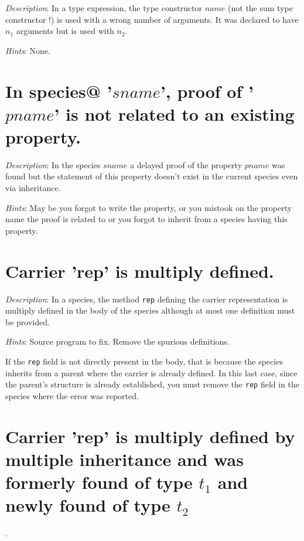{\em Description}: In a type expression, the type constructor $name$
(not the sum type constructor !) is used with a wrong number of
arguments. It was declared to have $n_1$ arguments but is used with
$n_2$.

{\em Hints}: None.


\section*{In species@ '$sname$', proof of '$pname$' is not related to
  an existing property.}

{\em Description}: In the species $sname$ a delayed proof of the
property $pname$ was found but the statement of this property doesn't
exist in the current species even via inheritance.


{\em Hints}: May be you forgot to write the property, or you mistook
on the property name the proof is related to or you forgot to inherit
from a species having this property.



\section*{Carrier 'rep' is multiply defined.}

{\em Description}: In a species, the method {\tt rep} defining the
carrier representation is multiply defined in the body of the species
although at most one definition must be provided.

{\em Hints}: Source program to fix. Remove the spurious definitions.

If the {\tt rep} field is not directly present in the
body, that is because the species inherits from a parent where the
carrier is already defined. In this last case, since the parent's
structure is already established, you must remove the {\tt rep} field
in the species where the error was reported.



\section*{Carrier 'rep' is multiply defined by multiple inheritance and
  was formerly found of type $t_1$ and newly found of type $t_2$}.

